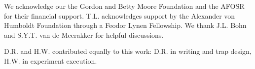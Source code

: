\documentclass[%
 reprint,
groupedaddress,
 amsmath,amssymb,
 aps,
prl,
]{revtex4-1}
\begin{document}
We acknowledge our the Gordon and Betty Moore Foundation and the AFOSR for their financial support. T.L. acknowledges support by the Alexander von Humboldt Foundation through a Feodor Lynen Fellowship. We thank J.L. Bohn and S.Y.T. van de Meerakker for helpful discussions.

D.R. and H.W. contributed equally to this work: D.R. in writing and trap design, H.W. in experiment execution.


\end{document}
